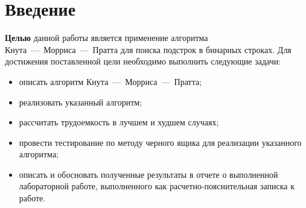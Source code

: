 \chapter*{Введение}

\textbf{Целью} данной работы является применение алгоритма Кнута~---~Морриса~---~Пратта для поиска подстрок в бинарных строках. Для достижения поставленной цели необходимо выполнить следующие задачи:
\begin{itemize}[label=---]
	\item описать алгоритм Кнута~---~Морриса~---~Пратта;
	\item реализовать указанный алгоритм;
	\item рассчитать трудоемкость в лучшем и худшем случаях;
	\item провести тестирование по методу черного ящика для реализации указанного алгоритма;
	\item описать и обосновать полученные результаты в отчете о выполненной лабораторной работе, выполненного как расчетно-пояснительная записка к работе.
\end{itemize}